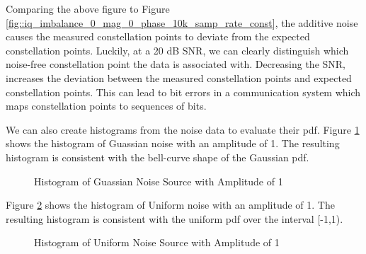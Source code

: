 \documentclass{article}
\begin{document}
Comparing the above figure to Figure \ref{fig::iq_imbalance_0_mag_0_phase_10k_samp_rate_const}, the additive noise causes the measured constellation points to deviate from the expected constellation points. Luckily, at a 20 dB SNR, we can clearly distinguish which noise-free constellation point the data is associated with. Decreasing the SNR, increases the deviation between the measured constellation points and expected constellation points. This can lead to bit errors in a communication system which maps constellation points to sequences of bits.

We can also create histograms from the noise data to evaluate their pdf. Figure \ref{fig::gaussian_noise_histogram} shows the histogram of Guassian noise with an amplitude of 1. The resulting histogram is consistent with the bell-curve shape of the Gaussian pdf.

\begin{figure}[H]
	\centerline{}
	\caption{Histogram of Guassian Noise Source with Amplitude of 1}
	\label{fig::gaussian_noise_histogram}
\end{figure}

Figure \ref{fig::uniform_noise_histogram} shows the histogram of Uniform noise with an amplitude of 1. The resulting histogram is consistent with the uniform pdf over the interval [-1,1).

\begin{figure}[H]
	\centerline{}
	\caption{Histogram of Uniform Noise Source with Amplitude of 1}
	\label{fig::uniform_noise_histogram}
\end{figure}
\end{document}
